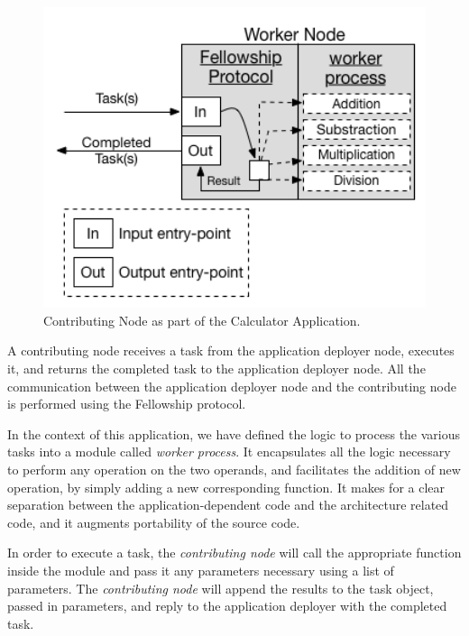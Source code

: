 \documentclass[12pt, titlepage]{uo_temp}
\begin{document}
     \begin{figure}[h!]
       \centering
       \includegraphics[width=125mm]{images/calc_node.png}
       \caption{Contributing Node as part of the Calculator Application.}
     \end{figure}
     A contributing node receives a task from the application deployer node, executes it,
     and returns the completed task to the application deployer node. All the
     communication between the application deployer node and the contributing node is
     performed using the Fellowship protocol.

     In the context of this application, we have defined the logic to process the various
     tasks into a module called \emph{worker process}. It encapsulates all the logic
     necessary to perform any operation on the two operands, and facilitates the addition
     of new operation, by simply adding a new corresponding function. It makes for a
     clear separation between the application-dependent code and the architecture related
     code, and it augments portability of the source code.

     In order to execute a task, the \emph{contributing node} will call the appropriate
     function inside the module and pass it any parameters necessary using a list of
     parameters. The \emph{contributing node} will append the results to the task object,
     passed in parameters, and reply to the application deployer with the completed task.
\end{document}
